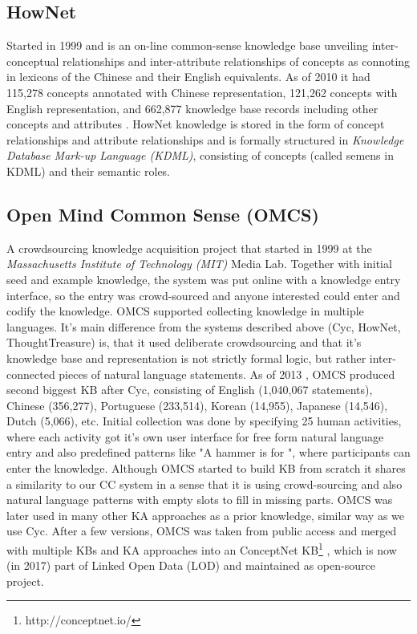\subsection{HowNet}
\label{section:r:hownet}
Started in 1999 and is an on-line common-sense knowledge base 
unveiling inter-conceptual relationships and inter-attribute relationships of 
concepts as connoting in lexicons of the Chinese and their English equivalents. 
As of 2010 it had 115,278 concepts annotated with Chinese representation, 
121,262 concepts with English representation, and 662,877 knowledge base records
including other concepts and attributes \parencite{Dong2010}. HowNet knowledge 
is stored in the form of concept relationships and attribute relationships and 
is formally structured in \emph{Knowledge Database Mark-up Language (KDML)}, consisting
of concepts (called semens in KDML) and their semantic roles.
 
\subsection{Open Mind Common Sense (OMCS)}
\label{section:r:omcs}
A crowdsourcing knowledge acquisition 
project that started in 1999 at the \emph{Massachusetts Institute of Technology (MIT)} Media Lab\parencite{Singh2002a}. 
Together with initial seed and example knowledge, the system was put online with
a knowledge entry interface, so the entry was crowd-sourced and anyone 
interested could enter and codify the knowledge. OMCS supported collecting 
knowledge in multiple languages. It's main difference from the systems described
above (Cyc, HowNet, ThoughtTreasure) is, that it used deliberate crowdsourcing
and that it's knowledge base and representation is not strictly formal logic, 
but rather inter-connected pieces of natural language statements. As of 2013 
\parencite{Zang2013}, OMCS produced second biggest KB after Cyc, consisting of 
English (1,040,067 statements), Chinese (356,277), Portuguese (233,514), 
Korean (14,955), Japanese (14,546), Dutch (5,066), etc. Initial collection was
done by specifying 25 human activities, where each activity got it's own user 
interface for free form natural language entry and also predefined patterns 
like "A hammer is for \underline{\hspace{1.0cm}}", where participants can enter
the knowledge. Although OMCS started to build KB from scratch it shares a 
similarity to our CC system in a sense that it is using crowd-sourcing and also
natural language patterns with empty slots to fill in missing parts. OMCS was
later used in many other KA approaches as a prior knowledge, similar way as we 
use Cyc. After a few versions, OMCS was taken from public access and merged with
multiple KBs and KA approaches into an ConceptNet 
KB\footnote{http://conceptnet.io/} \parencite{Speer2016}, which is now (in 2017)
part of Linked Open Data (LOD) and maintained as open-source project.

